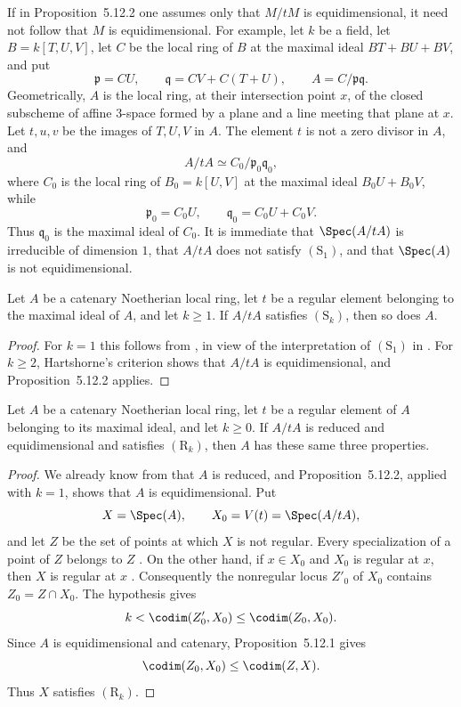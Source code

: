 \begin{remark}[5.12.3]
\label{IV.5.12.3}
If in Proposition~5.12.2 one assumes only that $M/tM$ is
equidimensional, it need not follow that $M$ is
equidimensional.  For example, let $k$ be a field, let
$B=k[T,U,V]$, let $C$ be the local ring of $B$ at the maximal
ideal $BT+BU+BV$, and put
\[
  \mathfrak p=CU,\qquad
  \mathfrak q=CV+C(T+U),\qquad
  A=C/\mathfrak p\mathfrak q.
\]
Geometrically, $A$ is the local ring, at their intersection
point $x$, of the closed subscheme of affine $3$-space formed by
a plane and a line meeting that plane at $x$.  Let $t,u,v$ be the
images of $T,U,V$ in $A$.  The element $t$ is not a zero divisor
in $A$, and
\[
  A/tA\simeq C_0/\mathfrak p_0\mathfrak q_0,
\]
where $C_0$ is the local ring of $B_0=k[U,V]$ at the maximal
ideal $B_0U+B_0V$, while
\[
  \mathfrak p_0=C_0U,\qquad
  \mathfrak q_0=C_0U+C_0V.
\]
Thus $\mathfrak q_0$ is the maximal ideal of $C_0$.  It is
immediate that $\Spec(A/tA)$ is irreducible of dimension $1$,
that $A/tA$ does not satisfy $(\mathrm S_1)$, and that
$\Spec(A)$ is not equidimensional.
\end{remark}

\begin{corollary}[5.12.4]
\label{IV.5.12.4}
Let $A$ be a catenary Noetherian local ring, let $t$ be a regular
element belonging to the maximal ideal of $A$, and let $k\geq1$.
If $A/tA$ satisfies $(\mathrm S_k)$, then so does $A$.
\end{corollary}

\begin{proof}
For $k=1$ this follows from , in view of the
interpretation of $(\mathrm S_1)$ in .  For
$k\geq2$, Hartshorne's criterion  shows that
$A/tA$ is equidimensional, and Proposition~5.12.2 applies.
\end{proof}

\begin{proposition}[5.12.5]
\label{IV.5.12.5}
Let $A$ be a catenary Noetherian local ring, let $t$ be a regular
element of $A$ belonging to its maximal ideal, and let $k\geq0$.
If $A/tA$ is reduced and equidimensional and satisfies
$(\mathrm R_k)$, then $A$ has these same three properties.
\end{proposition}

\begin{proof}
We already know from  that $A$ is reduced, and
Proposition~5.12.2, applied with $k=1$, shows that $A$ is
equidimensional.  Put
\[
  X=\Spec(A),\qquad X_0=V(t)=\Spec(A/tA),
\]
and let $Z$ be the set of points at which $X$ is not regular.
Every specialization of a point of $Z$ belongs to $Z$
.  On the other hand, if $x\in X_0$ and $X_0$
is regular at $x$, then $X$ is regular at $x$
.  Consequently the nonregular locus $Z'_0$
of $X_0$ contains $Z_0=Z\cap X_0$.  The hypothesis gives
\[
  k<\codim(Z'_0,X_0)\leq\codim(Z_0,X_0).
\]
Since $A$ is equidimensional and catenary, Proposition~5.12.1
gives
\[
  \codim(Z_0,X_0)\leq\codim(Z,X).
\]
Thus $X$ satisfies $(\mathrm R_k)$.
\end{proof}

